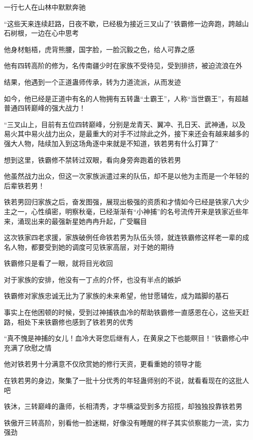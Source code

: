
\begin{this_body}

一行七人在山林中默默奔驰

“这些天来连续赶路，日夜不歇，已经极为接近三叉山了”铁霸修一边奔跑，跨越山石树根，一边在心中思考

他身材魁梧，虎背熊腰，国字脸，一脸沉毅之色，给人可靠之感

他有四转高阶的修为，名传南疆少时在家族不受待见，受到排挤，被迫流浪在外

结果，他遇到一个正道蛊师传承，转为力道流派，从而发迹

如今，他已经是正道中有名的人物拥有五转蛊“土霸王”，人称“当世霸王”，有超越普通四转巅峰的强大战力！

“三叉山上，目前有五位四转巅峰，分别是龙青天、翼冲、孔日天、武神通，以及易火其中易火战力出众，是最重大的对手不过除此之外，接下来还会有越来越多的强大人物，陆续加入到这场角逐中来就是不知道，铁若男有什么打算了”

想到这里，铁霸修不禁转过双眼，看向身旁奔跑着的铁若男

他虽然战力出众，但这一次家族派遣过来的队伍，却不是以他为主而是一个年轻的后辈铁若男！

铁若男回归家族之后，奋发图强，展现出极强的资质和才情如今已经是铁家八大少主之一，心性缜密，明察秋毫，已经渐渐有“小神捕”的名号流传开来是铁家近些年来，涌现出来的最强新星她冉冉升起，广受瞩目

这次铁家四老求援，家族破例任命铁若男为队伍头领，就连铁霸修这样老一辈的成名人物，都要受到她的调度可见铁家高层，对于她的期待

铁霸修只是看了一眼，就将目光收回

对于家族的安排，他没有一丁点的介怀，也没有半点的嫉妒

铁霸修对家族忠诚无比为了家族的未来希望，他甘愿辅佐，成为踏脚的基石

事实上在他困顿的时候，受到过神捕铁血冷的帮助铁霸修一直感恩在心，这些天赶路，相处下来铁霸修也感到了铁若男的优秀

“真不愧是神捕的女儿！血冷大哥您后继有人，在黄泉之下也能瞑目！”铁霸修心中充满了欣慰之情

他对铁若男十分满意不仅欣赏她的修行天资，更看重她的领导才能

在铁若男的身边，聚集了一批十分优秀的年轻蛊师别的不说，就看看现在的这批人吧

铁沐，三转巅峰的蛊师，长相清秀，才华横溢受到多方招揽，却独独投靠铁若男

铁傲开三转高阶，别看他一脸迷糊，好像没有睡醒的样子其实侦察能力一流，实力强劲


\end{this_body}
